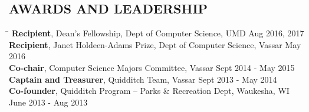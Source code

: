\documentclass{res}
\begin{document}
\begin{resume}
{  \vspace{-16pt}
  \section{\hspace{0.2in}AWARDS AND LEADERSHIP}
    \vspace{-3pt}
    \begin{tabbing}
      \hspace{5.65in}\=  \kill %
      {\bf Recipient}, Dean's Fellowship, Dept of Computer Science, UMD\>
          Aug 2016, 2017\\
      {\bf Recipient}, Janet Holdeen-Adams Prize, Dept of Computer Science, Vassar\>
          May 2016\\
      {\bf Co-chair}, Computer Science Majors Committee, Vassar\>
          Sept 2014 - May 2015\\
      {\bf Captain and Treasurer}, Quidditch Team, Vassar\>
          Sept 2013 - May 2014\\
      {\bf Co-founder}, Quidditch Program -- Parks \& Recreation Dept, Waukesha, WI\>
           June 2013 - Aug 2013\\
    \end{tabbing}
} %
\end{resume}
\end{document}
